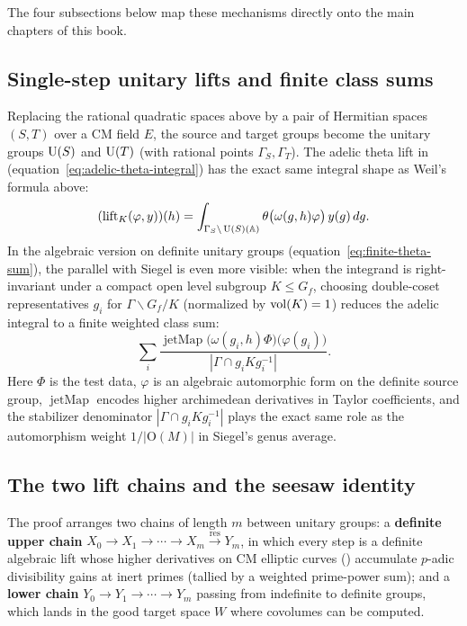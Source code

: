 The four subsections below map these mechanisms directly onto the main chapters of this book.

\subsection{Single-step unitary lifts and finite class sums}

Replacing the rational quadratic spaces above by a pair of Hermitian spaces $(S,T)$ over a CM field $E$, the source and target groups become the unitary groups $\operatorname{U}(S)$ and $\operatorname{U}(T)$ (with rational points $\Gamma_S,\Gamma_T$). The adelic theta lift in  (equation~\eqref{eq:adelic-theta-integral}) has the exact same integral shape as Weil's formula above:
\[
(\operatorname{lift}_K(\varphi,y))(h)
=\int_{\Gamma_S\backslash \operatorname{U}(S)(\mathbb{A})}
  \theta\bigl(\omega(g,h)\varphi\bigr)\,y(g)\,dg.
\]
In the algebraic version on definite unitary groups (equation~\eqref{eq:finite-theta-sum}), the parallel with Siegel is even more visible: when the integrand is right-invariant under a compact open level subgroup $K\le G_f$, choosing double-coset representatives $g_i$ for $\Gamma\backslash G_f/K$ (normalized by $\operatorname{vol}(K)=1$) reduces the adelic integral to a finite weighted class sum:
\[
\sum_i \frac{\operatorname{jetMap}\bigl(\omega(g_i,h)\Phi\bigr)\bigl(\varphi(g_i)\bigr)}{|\Gamma\cap g_i K g_i^{-1}|}.
\]
Here $\Phi$ is the test data, $\varphi$ is an algebraic automorphic form on the definite source group, $\operatorname{jetMap}$ encodes higher archimedean derivatives in Taylor coefficients, and the stabilizer denominator $|\Gamma\cap g_i K g_i^{-1}|$ plays the exact same role as the automorphism weight $1/|\mathrm O(M)|$ in Siegel's genus average.

\subsection{The two lift chains and the seesaw identity}

The proof arranges two chains of length $m$ between unitary groups: a \textbf{definite upper chain} $X_0\to X_1\to\cdots\to X_m\xrightarrow{\operatorname{res}}Y_m$, in which every step is a definite algebraic lift whose higher derivatives on CM elliptic curves () accumulate $p$-adic divisibility gains at inert primes (tallied by a weighted prime-power sum); and a \textbf{lower chain} $Y_0\to Y_1\to\cdots\to Y_m$ passing from indefinite to definite groups, which lands in the good target space $W$ where covolumes can be computed.

